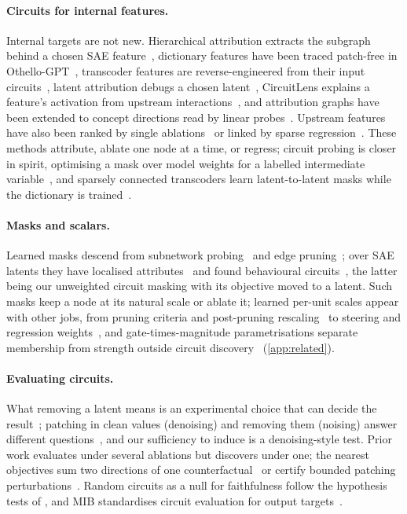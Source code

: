 \documentclass[10pt]{article}
\begin{document}
\paragraph{Circuits for internal features.}
Internal targets are not new.
Hierarchical attribution extracts the subgraph behind a chosen SAE feature~\citep{ge2024automatically}, dictionary features have been traced patch-free in Othello-GPT~\citep{he2024dictionary}, transcoder features are reverse-engineered from their input circuits~\citep{dunefsky2024transcoders}, latent attribution debugs a chosen latent~\citep{duprelatour2025debugging}, CircuitLens explains a feature's activation from upstream interactions~\citep{golimblevskaia2025circuit}, and attribution graphs have been extended to concept directions read by linear probes~\citep{palit2026probes}.
Upstream features have also been ranked by single ablations~\citep{cunningham2024sparse} or linked by sparse regression~\citep{yin2026scalable}.
These methods attribute, ablate one node at a time, or regress; circuit probing is closer in spirit, optimising a mask over model weights for a labelled intermediate variable~\citep{lepori2023uncovering}, and sparsely connected transcoders learn latent-to-latent masks while the dictionary is trained~\citep{drori2025sparsely}.

\paragraph{Masks and scalars.}
Learned masks descend from subnetwork probing~\citep{cao2021low, conmy2023towards} and edge pruning~\citep{bhaskar2024finding, li2024optimal}; over SAE latents they have localised attributes~\citep{chaudhary2024evaluating} and found behavioural circuits~\citep{caples2025scaling}, the latter being our unweighted circuit masking with its objective moved to a latent.
Such masks keep a node at its natural scale or ablate it; learned per-unit scales appear with other jobs, from pruning criteria and post-pruning rescaling~\citep{liu2017learning, kwon2022fast} to steering and regression weights~\citep{stoehr2024activation, yin2026scalable}, and gate-times-magnitude parametrisations separate membership from strength outside circuit discovery~\citep{louizos2018learning, lai2025joint} (\cref{app:related}).

\paragraph{Evaluating circuits.}
What removing a latent means is an experimental choice that can decide the result~\citep{li2024optimal, miller2024transformer, mueller2024missed}; patching in clean values (denoising) and removing them (noising) answer different questions~\citep{heimersheim2024patching}, and our sufficiency to induce is a denoising-style test.
Prior work evaluates under several ablations but discovers under one; the nearest objectives sum two directions of one counterfactual~\citep{chen2025rethinking} or certify bounded patching perturbations~\citep{hadad2026formal}.
Random circuits as a null for faithfulness follow the hypothesis tests of \citet{shi2024hypothesis}, and MIB standardises circuit evaluation for output targets~\citep{mueller2025mib}.
\end{document}
